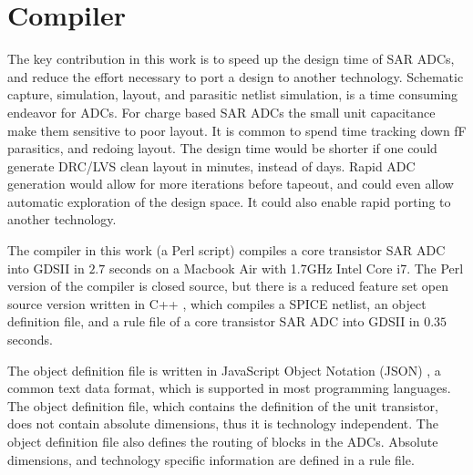 \section{Compiler} \label{compiler}
The key contribution in this work is to speed up the design time
of SAR ADCs, and reduce the effort necessary to port a design to
another technology. Schematic capture, simulation,  layout, and
parasitic netlist simulation, is a time consuming endeavor for
ADCs. For
charge based SAR ADCs the small unit capacitance make them sensitive to poor
 layout. It is common to spend time tracking down fF
parasitics, and redoing  layout. The design time would be
shorter if one could generate DRC/LVS clean layout in minutes, instead
of days. Rapid ADC generation would allow for more iterations before tapeout, and
could even allow automatic exploration of the design space. It could
also enable rapid porting to another technology.

The compiler in this work (a Perl script) compiles a core transistor
SAR ADC into GDSII in $2.7$ seconds on a Macbook Air with 1.7GHz Intel Core i7. The Perl version of the
compiler is closed source, but there is a reduced feature set open
source version written in C++ \cite{ciccreator16}, which
compiles a SPICE netlist, an object definition file, and a rule file of a core transistor SAR ADC into GDSII in $0.35$ seconds.


The object definition
file is written in JavaScript Object Notation (JSON) \cite{json16}, a common text
data format, which is supported in most programming languages. The object definition file, which contains the definition of the unit transistor, does not contain absolute
dimensions, thus it is technology independent.  The object definition file also defines
the routing of blocks in the ADCs.
Absolute dimensions, and technology specific information are defined
in a rule file.


